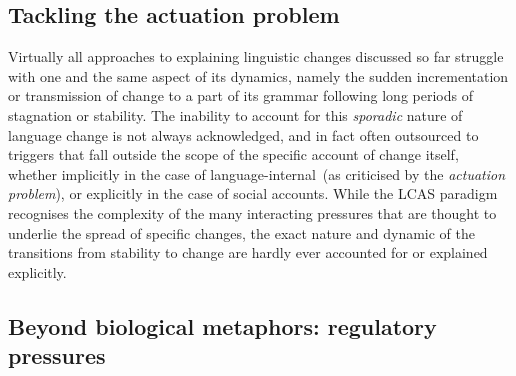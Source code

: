 

\subsection{Tackling the actuation problem}


Virtually all approaches to explaining linguistic changes discussed so far struggle with one and the same aspect of its dynamics, namely the sudden incrementation or transmission of change to a part of its grammar following long periods of stagnation or stability. The inability to account for this \emph{sporadic} nature of language change is not always acknowledged, and in fact often outsourced to triggers that fall outside the scope of the specific account of change itself, whether implicitly in the case of language-internal~(as criticised by the \emph{actuation problem}), or explicitly in the case of social accounts.
While the LCAS paradigm recognises the complexity of the many interacting pressures that are thought to underlie the spread of specific changes, the exact nature and dynamic of the transitions from stability to change are hardly ever accounted for or explained explicitly.

\subsection{Beyond biological metaphors: regulatory pressures}

